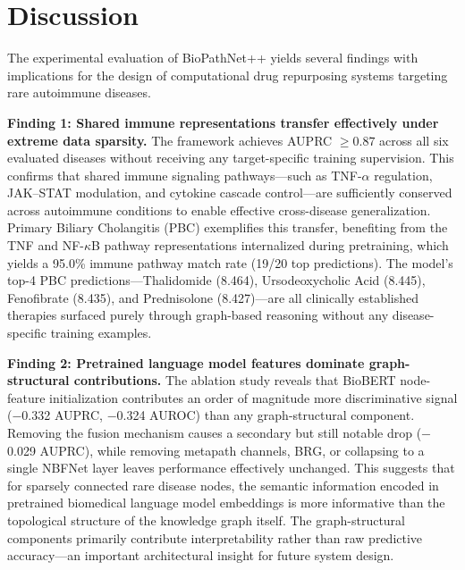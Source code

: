 \documentclass[conference]{IEEEtran}
\begin{document}
\section{Discussion}

The experimental evaluation of BioPathNet++ yields several findings with implications for the design of computational drug repurposing systems targeting rare autoimmune diseases.

\textbf{Finding 1: Shared immune representations transfer effectively under extreme data sparsity.} The framework achieves AUPRC $\geq 0.87$ across all six evaluated diseases without receiving any target-specific training supervision. This confirms that shared immune signaling pathways---such as TNF-$\alpha$ regulation, JAK--STAT modulation, and cytokine cascade control---are sufficiently conserved across autoimmune conditions to enable effective cross-disease generalization. Primary Biliary Cholangitis (PBC) exemplifies this transfer, benefiting from the TNF and NF-$\kappa$B pathway representations internalized during pretraining, which yields a 95.0\% immune pathway match rate (19/20 top predictions). The model's top-4 PBC predictions---Thalidomide (8.464), Ursodeoxycholic Acid (8.445), Fenofibrate (8.435), and Prednisolone (8.427)---are all clinically established therapies surfaced purely through graph-based reasoning without any disease-specific training examples.

\textbf{Finding 2: Pretrained language model features dominate graph-structural contributions.} The ablation study reveals that BioBERT node-feature initialization contributes an order of magnitude more discriminative signal ($-$0.332 AUPRC, $-$0.324 AUROC) than any graph-structural component. Removing the fusion mechanism causes a secondary but still notable drop ($-$0.029 AUPRC), while removing metapath channels, BRG, or collapsing to a single NBFNet layer leaves performance effectively unchanged. This suggests that for sparsely connected rare disease nodes, the semantic information encoded in pretrained biomedical language model embeddings is more informative than the topological structure of the knowledge graph itself. The graph-structural components primarily contribute interpretability rather than raw predictive accuracy---an important architectural insight for future system design.
\end{document}
